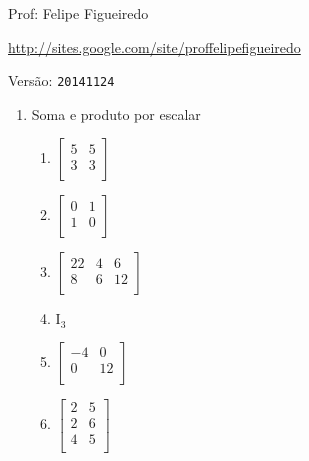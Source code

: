 \documentclass[a4paper]{article}
\begin{document}
\parbox[c]{.825\textwidth}{\raggedright%
{Prof: Felipe Figueiredo\par}
{\url{http://sites.google.com/site/proffelipefigueiredo}\par}
}


Versão: \verb|20141124|



\begin{multicols}{2}

  \begin{enumerate}
  \item Soma e produto por escalar

    \begin{enumerate}
    \item
      $  \begin{bmatrix}
        5 & 5\\
        3 & 3\\
      \end{bmatrix}
      $

    \item 
      $
      \begin{bmatrix}
        0 & 1\\
        1 & 0\\
      \end{bmatrix}
      $

    \item 
      $
      \begin{bmatrix}
        22 & 4 & 6\\
        8 & 6 & 12\\
      \end{bmatrix}
      $

    \item $\mathrm{I}_3$
      
    \item 
      $
      \begin{bmatrix}
        -4 & 0\\
        0 & 12\\
      \end{bmatrix}
      $

    \item 
      $ 
      \begin{bmatrix}
        2 & 5\\
        2 & 6\\
        4 & 5\\
      \end{bmatrix}
      $


\end{enumerate}
\end{enumerate}
\end{multicols}
\end{document}
